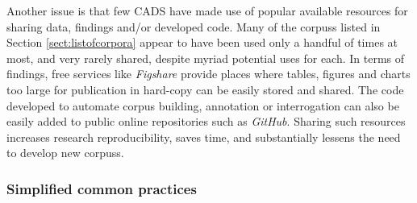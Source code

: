 


Another issue is that few \gls{CADS} have made use of popular available resources for sharing data, findings and\slash or developed code. Many of the \glspl{corpus} listed in Section \ref{sect:listofcorpora} appear to have been used only a handful of times at most, and very rarely shared, despite myriad potential uses for each. In terms of findings, free services like \emph{Figshare} provide places where tables, figures and charts too large for publication in hard\hyp{}copy can be easily stored and shared. The code developed to automate \gls{corpus} building, annotation or interrogation can also be easily added to public online repositories such as \emph{GitHub}. Sharing such resources increases research reproducibility, saves time, and substantially lessens the need to develop new \glspl{corpus}.

\subsubsection{Simplified common practices} \label{sect:cl-shortcomings}

